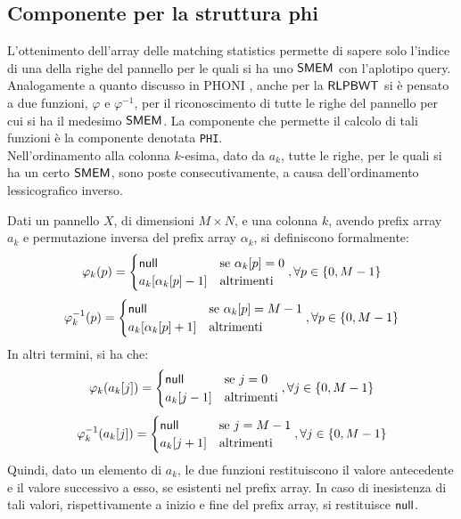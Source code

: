 \subsection{Componente per la struttura phi}
\label{secphi}
L'ottenimento dell'array delle matching statistics permette di sapere solo
l'indice di una della righe del pannello per le quali si ha uno $\mbox{\rm {\sf SMEM}}$ con
l'aplotipo query. Analogamente a quanto discusso in PHONI \cite{phoni},
anche per la $\mbox{\rm {\sf RLPBWT}}$ si è pensato a due funzioni, $\varphi$ e
$\varphi^{-1}$, per il riconoscimento di tutte le
righe del pannello per cui si ha il medesimo $\mbox{\rm {\sf SMEM}}$. La componente che
permette il calcolo 
di tali funzioni è la componente denotata \texttt{PHI}.\\
Nell'ordinamento alla
colonna $k$-esima, dato da $a_k$, tutte le righe, per le quali si ha un certo
$\mbox{\rm {\sf SMEM}}$, sono poste consecutivamente, a causa dell'ordinamento
lessicografico inverso.
\begin{definizione}
  Dati un pannello $X$, di dimensioni $M\times N$, e una colonna $k$, avendo
  prefix array $a_k$ e permutazione inversa del prefix array $\alpha_k$, si
  definiscono formalmente: 
  \[\varphi_k(p)=
    \begin{cases}
      \mbox{\rm {\sf null}}&\mbox{se }\alpha_k[p]=0\\
      a_k[\alpha_k[p]-1]&\mbox{altrimenti}
    \end{cases},\forall p\in\{0,M-1\}
  \]
  \[\varphi^{-1}_k(p)=
    \begin{cases}
      \mbox{\rm {\sf null}}&\mbox{se }\alpha_k[p]=M-1\\
      a_k[\alpha_k[p]+1]&\mbox{altrimenti}
    \end{cases},\forall p\in\{0,M-1\}
  \]
  In altri termini, si ha che:
  \[\varphi_k(a_k[j])=
    \begin{cases}
     \mbox{\rm {\sf null}}&\mbox{se }j=0\\
      a_k[j-1]&\mbox{altrimenti}
    \end{cases},\forall j\in\{0,M-1\}
  \]
  \[\varphi^{-1}_k(a_k[j])=
    \begin{cases}
      \mbox{\rm {\sf null}}&\mbox{se }j=M-1\\
      a_k[j+1]&\mbox{altrimenti}
    \end{cases},\forall j\in\{0,M-1\}
  \]
  Quindi, dato un elemento di $a_k$, le due funzioni restituiscono il valore
  antecedente e il valore successivo a esso, se
  esistenti nel prefix array. In caso di inesistenza di tali valori,
  rispettivamente a inizio
  e fine del prefix array, si
  restituisce $\mbox{\rm {\sf null}}$.
\end{definizione}
